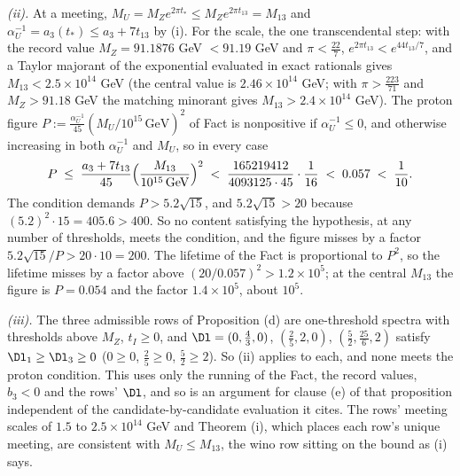 \emph{(ii).} At a meeting, $M_{U} = M_{Z}e^{2\pi t_{*}} \le M_{Z}e^{2\pi t_{13}} = M_{13}$ and $\alpha_{U}^{-1} = a_{3}(t_{*}) \le a_{3} + 7t_{13}$ by (i). For the scale, the one transcendental step: with the record value $M_{Z} = 91.1876$ GeV $< 91.19$ GeV and $\pi < \tfrac{22}{7}$, $e^{2\pi t_{13}} < e^{44t_{13}/7}$, and a Taylor majorant of the exponential evaluated in exact rationals gives $M_{13} < 2.5 \times 10^{14}$ GeV (the central value is $2.46 \times 10^{14}$ GeV; with $\pi > \tfrac{223}{71}$ and $M_{Z} > 91.18$ GeV the matching minorant gives $M_{13} > 2.4 \times 10^{14}$ GeV). The proton figure $P := \tfrac{\alpha_{U}^{-1}}{45}(M_{U}/10^{15}\,\mathrm{GeV})^{2}$ of Fact  is nonpositive if $\alpha_{U}^{-1} \le 0$, and otherwise increasing in both $\alpha_{U}^{-1}$ and $M_{U}$, so in every case
\[
P \;\le\; \frac{a_{3} + 7t_{13}}{45}\Bigl(\frac{M_{13}}{10^{15}\,\mathrm{GeV}}\Bigr)^{2} \;<\; \frac{165219412}{4093125 \cdot 45} \cdot \frac{1}{16} \;<\; 0.057 \;<\; \frac{1}{10}.
\]
The condition demands $P > 5.2\sqrt{15}$, and $5.2\sqrt{15} > 20$ because $(5.2)^{2} \cdot 15 = 405.6 > 400$. So no content satisfying the hypothesis, at any number of thresholds, meets the condition, and the figure misses by a factor $5.2\sqrt{15}/P > 20 \cdot 10 = 200$. The lifetime of the Fact is proportional to $P^{2}$, so the lifetime misses by a factor above $(20/0.057)^{2} > 1.2 \times 10^{5}$; at the central $M_{13}$ the figure is $P = 0.054$ and the factor $1.4 \times 10^{5}$, about $10^{5}$.

\emph{(iii).} The three admissible rows of Proposition (d) are one-threshold spectra with thresholds above $M_{Z}$, $t_{I} \ge 0$, and $\Dl = (0, \tfrac43, 0)$, $(\tfrac25, 2, 0)$, $(\tfrac52, \tfrac{25}{6}, 2)$ satisfy $\Dl_{1} \ge \Dl_{3} \ge 0$ ($0 \ge 0$, $\tfrac25 \ge 0$, $\tfrac52 \ge 2$). So (ii) applies to each, and none meets the proton condition. This uses only the running of the Fact, the record values, $b_{3} < 0$ and the rows' $\Dl$, and so is an argument for clause (e) of that proposition independent of the candidate-by-candidate evaluation it cites. The rows' meeting scales of $1.5$ to $2.5 \times 10^{14}$ GeV and Theorem (i), which places each row's unique meeting, are consistent with $M_{U} \le M_{13}$, the wino row sitting on the bound as (i) says.

